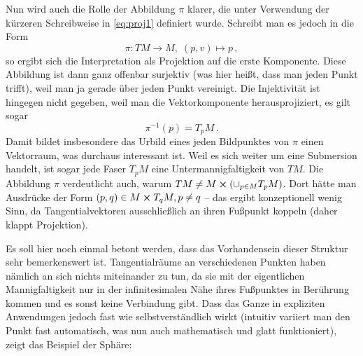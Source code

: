 \documentclass[../H_Analysis_main.tex]{subfiles}
\begin{document}
Nun wird auch die Rolle der Abbildung $\pi$ klarer, die unter Verwendung der kürzeren Schreibweise in \eqref{eq:proj1} definiert wurde. Schreibt man es jedoch in die Form
\begin{equation}
\pi: TM \rightarrow M, \; (p, v) \mapsto p \, ,
\end{equation}
so ergibt sich die Interpretation als Projektion auf die erste Komponente. Diese Abbildung ist dann ganz offenbar surjektiv (was hier heißt, dass man jeden Punkt trifft), weil man ja gerade über jeden Punkt vereinigt. Die Injektivität ist hingegen nicht gegeben, weil man die Vektorkomponente herausprojiziert, es gilt sogar
\begin{equation}
\pi^{-1}(p) = T_p M \, .
\end{equation}
Damit bildet insbesondere das Urbild eines jeden Bildpunktes von $\pi$ einen Vektorraum, was durchaus interessant ist. Weil es sich weiter um eine Submersion handelt, ist sogar jede Faser $T_p M$ eine Untermannigfaltigkeit von $TM$. Die Abbildung $\pi$ verdeutlicht auch, warum $TM \neq M \cross \qty(\cup_{p \in M} T_p M)$. Dort hätte man Ausdrücke der Form $(p, q) \in M \cross T_q M, p \neq q$ -- das ergibt konzeptionell wenig Sinn, da Tangentialvektoren ausschließlich an ihren Fußpunkt koppeln (daher klappt Projektion).%


Es soll hier noch einmal betont werden, dass das Vorhandensein dieser Struktur sehr bemerkenswert ist. Tangentialräume an verschiedenen Punkten haben nämlich an sich nichts miteinander zu tun, da sie mit der eigentlichen Mannigfaltigkeit nur in der infinitesimalen Nähe ihres Fußpunktes in Berührung kommen und es sonst keine Verbindung gibt. Dass das Ganze in expliziten Anwendungen jedoch fast wie selbstverständlich wirkt (intuitiv variiert man den Punkt fast automatisch, was nun auch mathematisch und glatt funktioniert), zeigt das Beispiel der Sphäre:

\end{document}
